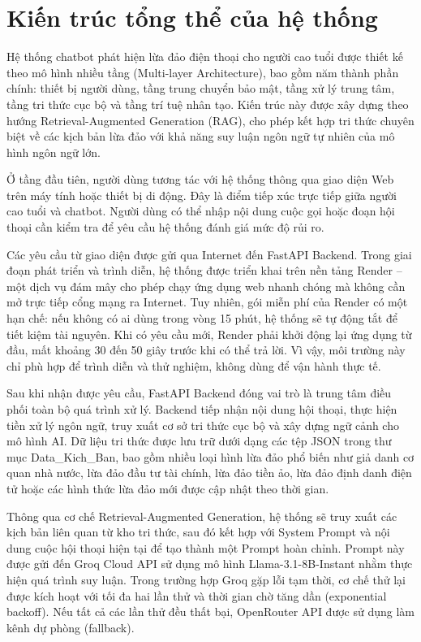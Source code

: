\section{Kiến trúc tổng thể của hệ thống}
Hệ thống chatbot phát hiện lừa đảo điện thoại cho người cao tuổi được thiết kế theo mô hình nhiều tầng (Multi-layer Architecture), bao gồm năm thành phần chính: thiết bị người dùng, tầng trung chuyển bảo mật, tầng xử lý trung tâm, tầng tri thức cục bộ và tầng trí tuệ nhân tạo. Kiến trúc này được xây dựng theo hướng Retrieval-Augmented Generation (RAG), cho phép kết hợp tri thức chuyên biệt về các kịch bản lừa đảo với khả năng suy luận ngôn ngữ tự nhiên của mô hình ngôn ngữ lớn.

Ở tầng đầu tiên, người dùng tương tác với hệ thống thông qua giao diện Web trên máy tính hoặc thiết bị di động. Đây là điểm tiếp xúc trực tiếp giữa người cao tuổi và chatbot. Người dùng có thể nhập nội dung cuộc gọi hoặc đoạn hội thoại cần kiểm tra để yêu cầu hệ thống đánh giá mức độ rủi ro.

Các yêu cầu từ giao diện được gửi qua Internet đến FastAPI Backend. Trong giai đoạn phát triển và trình diễn, hệ thống được triển khai trên nền tảng Render -- một dịch vụ đám mây cho phép chạy ứng dụng web nhanh chóng mà không cần mở trực tiếp cổng mạng ra Internet. Tuy nhiên, gói miễn phí của Render có một hạn chế: nếu không có ai dùng trong vòng 15 phút, hệ thống sẽ tự động tắt để tiết kiệm tài nguyên. Khi có yêu cầu mới, Render phải khởi động lại ứng dụng từ đầu, mất khoảng 30 đến 50 giây trước khi có thể trả lời. Vì vậy, môi trường này chỉ phù hợp để trình diễn và thử nghiệm, không dùng để vận hành thực tế.

Sau khi nhận được yêu cầu, FastAPI Backend đóng vai trò là trung tâm điều phối toàn bộ quá trình xử lý. Backend tiếp nhận nội dung hội thoại, thực hiện tiền xử lý ngôn ngữ, truy xuất cơ sở tri thức cục bộ và xây dựng ngữ cảnh cho mô hình AI. Dữ liệu tri thức được lưu trữ dưới dạng các tệp JSON trong thư mục Data\_Kich\_Ban, bao gồm nhiều loại hình lừa đảo phổ biến như giả danh cơ quan nhà nước, lừa đảo đầu tư tài chính, lừa đảo tiền ảo, lừa đảo định danh điện tử hoặc các hình thức lừa đảo mới được cập nhật theo thời gian.

Thông qua cơ chế Retrieval-Augmented Generation, hệ thống sẽ truy xuất các kịch bản liên quan từ kho tri thức, sau đó kết hợp với System Prompt và nội dung cuộc hội thoại hiện tại để tạo thành một Prompt hoàn chỉnh. Prompt này được gửi đến Groq Cloud API sử dụng mô hình Llama-3.1-8B-Instant nhằm thực hiện quá trình suy luận. Trong trường hợp Groq gặp lỗi tạm thời, cơ chế thử lại được kích hoạt với tối đa hai lần thử và thời gian chờ tăng dần (exponential backoff). Nếu tất cả các lần thử đều thất bại, OpenRouter API được sử dụng làm kênh dự phòng (fallback).

